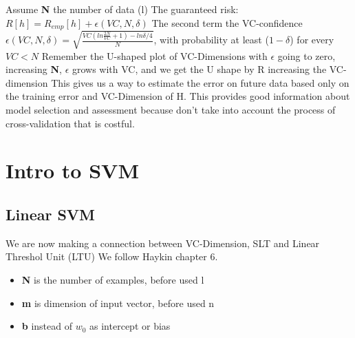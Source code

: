 \documentclass[12pt]{book}
\begin{document}
Assume \textbf{N} the number of data (l)
\newline\newline
The guaranteed risk: $R[h] = R_{emp}[h] + \epsilon(VC, N, \delta)$
\newline\newline
The second term the VC-confidence $\epsilon(VC, N, \delta) = \sqrt{\frac{VC(ln\frac{2N}{VC}+1)-ln\delta/4}{N}}$, with probability at least ($1-\delta$) for every $VC < N$
\newline\newline
Remember the U-shaped plot of VC-Dimensions with $\epsilon$ going to zero, increasing \textbf{N}, $\epsilon$ grows with VC, and we get the U shape by R increasing the VC-dimension
\newline\newline
This gives us a way to estimate the error on future data based only on the training error and VC-Dimension of H. This provides good information about model selection and assessment because don't take into account the process of cross-validation that is costful.

\section{Intro to SVM}

\subsection{Linear SVM}

We are now making a connection between VC-Dimension, SLT and Linear Threshol Unit (LTU) \newline
We follow Haykin chapter 6.
\begin{itemize}	
	\item \textbf{N} is the number of examples, before used l
	\item \textbf{m} is dimension of input vector, before used n
	\item \textbf{b} instead of $w_0$ as intercept or bias
\end{itemize}
\end{document}
